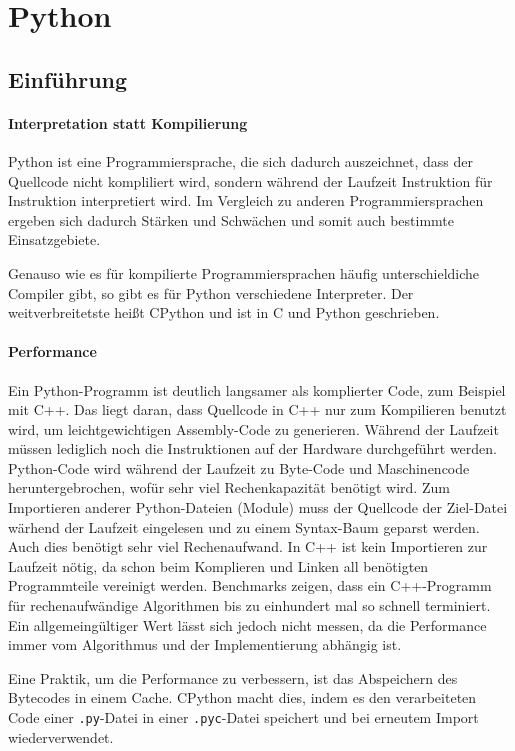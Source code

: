 \section{Python}
	\subsection{Einführung}
		\paragraph{Interpretation statt Kompilierung} Python ist eine Programmiersprache, die sich dadurch auszeichnet, dass der Quellcode nicht kompliliert wird, sondern während der Laufzeit Instruktion für Instruktion interpretiert wird. Im Vergleich zu anderen Programmiersprachen ergeben sich dadurch Stärken und Schwächen und somit auch bestimmte Einsatzgebiete. 
		
		Genauso wie es für kompilierte Programmiersprachen häufig unterschieldiche Compiler gibt, so gibt es für Python verschiedene Interpreter. Der weitverbreitetste heißt CPython und ist in C und Python geschrieben.
		
		\paragraph{Performance} Ein Python-Programm ist deutlich langsamer als komplierter Code, zum Beispiel mit C++. Das liegt daran, dass Quellcode in C++ nur zum Kompilieren benutzt wird, um leichtgewichtigen Assembly-Code zu generieren. Während der Laufzeit müssen lediglich noch die Instruktionen auf der Hardware durchgeführt werden.
		Python-Code wird während der Laufzeit zu Byte-Code und Maschinencode heruntergebrochen, wofür sehr viel Rechenkapazität benötigt wird. Zum Importieren anderer Python-Dateien (Module) muss der Quellcode der Ziel-Datei wärhend der Laufzeit eingelesen und zu einem Syntax-Baum geparst werden. Auch dies benötigt sehr viel Rechenaufwand. In C++ ist kein Importieren zur Laufzeit nötig, da schon beim Komplieren und Linken all benötigten Programmteile vereinigt werden. Benchmarks zeigen, dass ein C++-Programm für rechenaufwändige Algorithmen bis zu einhundert mal so schnell terminiert. Ein allgemeingültiger Wert lässt sich jedoch nicht messen, da die Performance immer vom Algorithmus und der Implementierung abhängig ist. \cite[vgl.][]{banchmarkgame2022cpppython}
		
		Eine Praktik, um die Performance zu verbessern, ist das Abspeichern des Bytecodes in einem Cache. CPython macht dies, indem es den verarbeiteten Code einer \lstinline|.py|-Datei in einer \lstinline|.pyc|-Datei speichert und bei erneutem Import wiederverwendet. \cite[vgl.][]{waraw2009bytecode}
		
